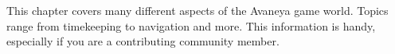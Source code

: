 

This chapter covers many different aspects of the Avaneya game world. Topics range from timekeeping to navigation and more. This information is handy, especially if you are a contributing community member.

%
%
%
%
%
%
%
%
%
%
%
%
%
%

%

\StopChapter

